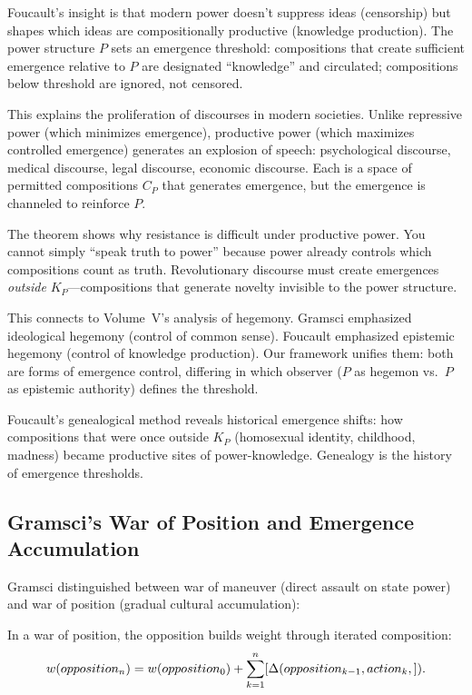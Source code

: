 \begin{interpretation}
Foucault's insight is that modern power doesn't suppress ideas (censorship) but
shapes which ideas are compositionally productive (knowledge production). The
power structure $P$ sets an emergence threshold: compositions that create
sufficient emergence relative to $P$ are designated ``knowledge'' and circulated;
compositions below threshold are ignored, not censored.

This explains the proliferation of discourses in modern societies. Unlike
repressive power (which minimizes emergence), productive power (which maximizes
controlled emergence) generates an explosion of speech: psychological discourse,
medical discourse, legal discourse, economic discourse. Each is a space of
permitted compositions $C_P$ that generates emergence, but the emergence is
channeled to reinforce $P$.

The theorem shows why resistance is difficult under productive power. You cannot
simply ``speak truth to power'' because power already controls which compositions
count as truth. Revolutionary discourse must create emergences \emph{outside}
$K_P$---compositions that generate novelty invisible to the power structure.

This connects to Volume~V's analysis of hegemony. Gramsci emphasized ideological
hegemony (control of common sense). Foucault emphasized epistemic hegemony
(control of knowledge production). Our framework unifies them: both are forms
of emergence control, differing in which observer ($P$ as hegemon vs.\ $P$ as
epistemic authority) defines the threshold.

Foucault's genealogical method reveals historical emergence shifts: how
compositions that were once outside $K_P$ (homosexual identity, childhood,
madness) became productive sites of power-knowledge. Genealogy is the history
of emergence thresholds.
\end{interpretation}

\subsection{Gramsci's War of Position and Emergence Accumulation}

Gramsci distinguished between war of maneuver (direct assault on state power)
and war of position (gradual cultural accumulation):

\begin{theorem}
\label{thm:war-of-position}
In a war of position, the opposition builds weight through iterated composition:
\[
  w(opposition_n) = w(opposition_0)
  + \sum_{k=1}^n [\Delta(opposition_{k-1}, action_k,]).
\]
\end{theorem}

